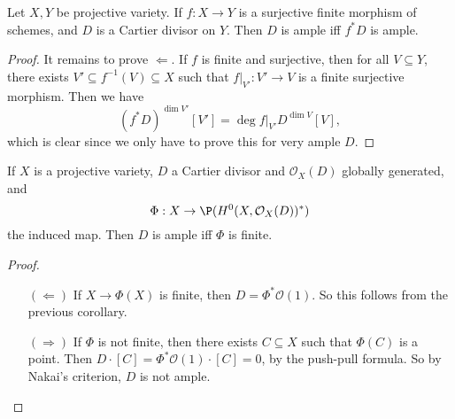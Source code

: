 \documentclass[a4paper]{article}
\begin{document}
\begin{cor}
  Let $X, Y$ be projective variety. If $f: X \to Y$ is a surjective finite morphism of schemes, and $D$ is a Cartier divisor on $Y$. Then $D$ is ample iff $f^*D$ is ample.
\end{cor}

\begin{proof}
  It remains to prove $\Leftarrow$. If $f$ is finite and surjective, then for all $V \subseteq Y$, there exists $V' \subseteq f^{-1}(V) \subseteq X$ such that $f|_{V'}: V' \to V$ is a finite surjective morphism. Then we have
  \[
    (f^* D)^{\dim V'} [V'] = \deg f|_{V'} D^{\dim V} [V],
  \]
  which is clear since we only have to prove this for very ample $D$.
\end{proof}

\begin{cor}
  If $X$ is a projective variety, $D$ a Cartier divisor and $\mathcal{O}_X(D)$ globally generated, and
  \[
    \Phi: X \to \P(H^0(X, \mathcal{O}_X(D))^*)
  \]
  the induced map. Then $D$ is ample iff $\Phi$ is finite.
\end{cor}

\begin{proof}\leavevmode
  \begin{enumerate}
    \item[$(\Leftarrow)$] If $X \to \Phi(X)$ is finite, then $D = \Phi^* \mathcal{O}(1)$. So this follows from the previous corollary.
    \item[$(\Rightarrow)$] If $\Phi$ is not finite, then there exists $C \subseteq X$ such that $\Phi(C)$ is a point. Then $D \cdot [C] = \Phi^* \mathcal{O}(1) \cdot [C] = 0$, by the push-pull formula. So by Nakai's criterion, $D$ is not ample.\qedhere
  \end{enumerate}
\end{proof}
\end{document}
